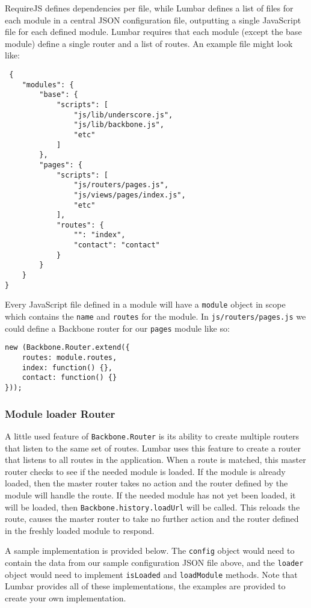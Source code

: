 \documentclass[9pt]{book}
\begin{document}
RequireJS defines dependencies per file, while Lumbar defines a list of
files for each module in a central JSON configuration file, outputting a
single JavaScript file for each defined module. Lumbar requires that
each module (except the base module) define a single router and a list
of routes. An example file might look like:

\begin{verbatim}
 {
    "modules": {
        "base": {
            "scripts": [
                "js/lib/underscore.js",
                "js/lib/backbone.js",
                "etc"
            ]
        },
        "pages": {
            "scripts": [
                "js/routers/pages.js",
                "js/views/pages/index.js",
                "etc"
            ],
            "routes": {
                "": "index",
                "contact": "contact"
            }
        }
    }
}
\end{verbatim}

Every JavaScript file defined in a module will have a \texttt{module}
object in scope which contains the \texttt{name} and \texttt{routes} for
the module. In \texttt{js/routers/pages.js} we could define a Backbone
router for our \texttt{pages} module like so:

\begin{verbatim}
new (Backbone.Router.extend({
    routes: module.routes,
    index: function() {},
    contact: function() {}
}));
\end{verbatim}

\subsubsection{Module loader Router}\label{module-loader-router}

A little used feature of \texttt{Backbone.Router} is its ability to
create multiple routers that listen to the same set of routes. Lumbar
uses this feature to create a router that listens to all routes in the
application. When a route is matched, this master router checks to see
if the needed module is loaded. If the module is already loaded, then
the master router takes no action and the router defined by the module
will handle the route. If the needed module has not yet been loaded, it
will be loaded, then \texttt{Backbone.history.loadUrl} will be called.
This reloads the route, causes the master router to take no further
action and the router defined in the freshly loaded module to respond.

A sample implementation is provided below. The \texttt{config} object
would need to contain the data from our sample configuration JSON file
above, and the \texttt{loader} object would need to implement
\texttt{isLoaded} and \texttt{loadModule} methods. Note that Lumbar
provides all of these implementations, the examples are provided to
create your own implementation.
\end{document}
